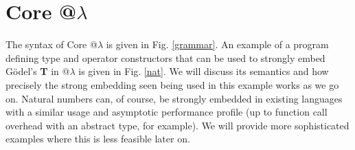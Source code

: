 \documentclass[9pt,preprint]{sigplanconf}
\begin{document}
\section{Core @$\lambda$}\label{core}

%

The syntax of Core @$\lambda$ is given in Fig. \ref{grammar}. An example of a program defining type and operator constructors that can be used to strongly embed G\"odel's \textbf{T} in @$\lambda$ is given in Fig. \ref{nat}. We will discuss its semantics and how precisely the strong embedding seen being used in this example works as we go on. Natural numbers can, of course, be strongly embedded in existing languages with a similar usage and asymptotic performance profile (up to function call overhead with an abstract type, for example). We will provide more sophisticated examples where this is less feasible later on. %
\end{document}
